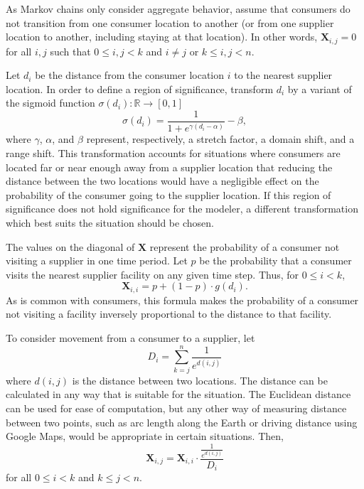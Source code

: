 \documentclass[twoside,twocolumn]{article}
\begin{document}
As Markov chains only consider aggregate behavior, assume that consumers do not transition from one consumer location to another (or from one supplier location to another, including staying at that location).
In other words, $\textbf{X}_{i, j} = 0$ for all $i, j$ such that $0 \leq i, j < k$  and $i \neq j$ or $k \leq i, j < n$.


Let $d_{i}$ be the distance from the consumer location $i$ to the nearest supplier location.
In order to define a region of significance, transform $d_i$ by a variant of the sigmoid function $\sigma(d_i): \mathbb{R} \rightarrow [0,1]$
\begin{equation}
\sigma(d_i) = \frac{1}{1 + e^{\gamma(d_i-\alpha)}} - \beta,
\end{equation}
where $\gamma$, $\alpha$, and $\beta$ represent, respectively, a stretch factor, a domain shift, and a range shift.
This transformation accounts for situations where consumers are located far or near enough away from a supplier location that reducing the distance  between the two locations would have a negligible effect on the probability of the consumer going to the supplier location.
If this region of significance does not hold significance for the modeler, a different transformation which best suits the situation should be chosen.

The values on the diagonal of $\textbf{X}$ represent the probability of a consumer not visiting a supplier in one time period.
Let $p$ be the probability that a consumer visits the nearest supplier facility 
on any given time step.
Thus, for $0 \leq i < k$, 
$$\textbf{X}_{i, i} = p + (1-p) \cdot g(d_{i}).$$
As is common with consumers, this formula makes the probability of a consumer not visiting a facility inversely proportional to the distance to that facility.

To consider movement from a consumer to a supplier, let
$$D_i = \sum_{k = j}^{n} \frac{1}{e^{d(i,j)}}$$
 where $d(i, j)$ is the distance between two locations.
The distance can be calculated in any way that is suitable for the situation.
The Euclidean distance can be used for ease of computation, but any other way of measuring distance between two points, such as arc length along the Earth or driving distance using Google Maps, would be appropriate in certain situations.
Then,
$$\textbf{X}_{i, j} = \textbf{X}_{i, i} \cdot \frac{\frac{1}{e^{d(i,j)}}}{D_i}$$
for all $0 \leq i < k$ and $k \leq j < n$.
\end{document}
